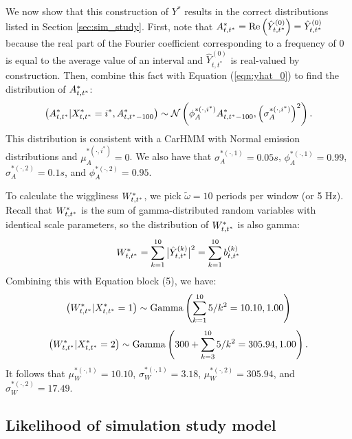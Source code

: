 %

We now show that this construction of $Y^*$ results in the correct distributions listed in Section \ref{sec:sim_study}. First, note that $A^*_{t,t^*} = \text{Re}\left(\hat{Y}^{(0)}_{t,t^*}\right) = \hat{Y}^{(0)}_{t,t^*}$ because the real part of the Fourier coefficient corresponding to a frequency of 0 is equal to the average value of an interval and $\hat{Y}^{(0)}_{t,t^*}$ is real-valued by construction. Then, combine this fact with Equation (\ref{eqn:yhat_0}) to find the distribution of $A^*_{t,t^*}$: 
%
$$\left(A^*_{t,t^*} | X^*_{t,t^*} = i^*, A^*_{t,t^*-100} \right) \sim \mathcal{N} \left(\phi_A^{*(\cdot,i^*)} A^*_{t,t^*-100}, \left(\sigma_A^{*(\cdot,i^*)}\right)^2 \right).$$
%
This distribution is consistent with a CarHMM with Normal emission distributions and $\mu_A^{*(\cdot,i^*)} = 0$. We also have that $\sigma_A^{*(\cdot,1)} = 0.05s$, $\phi_A^{*(\cdot,1)} = 0.99$, $\sigma_A^{*(\cdot,2)} = 0.1s$, and $\phi_A^{*(\cdot,2)} = 0.95$.

To calculate the wiggliness $W^*_{t,t^*}$, we pick $\tilde{\omega} = 10$ periods per window (or 5 Hz). Recall that $W^*_{t,t^*}$ is the sum of gamma-distributed random variables with identical scale parameters, so the distribution of $W^*_{t,t^*}$ is also gamma:
%
$$W^*_{t,t^*} = \sum_{k=1}^{10} \big|\hat{Y}^{(k)}_{t,t^*}\big|^2 = \sum_{k=1}^{10} b^{(k)}_{t,t^*}$$
Combining this with Equation block (5), we have:
%
$$\left(W^*_{t,t^*}|X^*_{t,t^*} = 1\right) \sim {\rm{Gamma}}\left(\sum_{k=1}^{10} 5/k^2 = 10.10, 1.00 \right)$$
%
$$\left(W^*_{t,t^*}|X^*_{t,t^*} = 2\right) \sim {\rm{Gamma}}\left(300 + \sum_{k=3}^{10} 5/k^2 = 305.94 , 1.00 \right).$$
%
It follows that $\mu_W^{*(\cdot,1)} = 10.10$, $\sigma_W^{*(\cdot,1)} = 3.18$, $\mu_W^{*(\cdot,2)} = 305.94$, and $\sigma_W^{*(\cdot,2)} = 17.49$.

\subsection{Likelihood of simulation study model}

